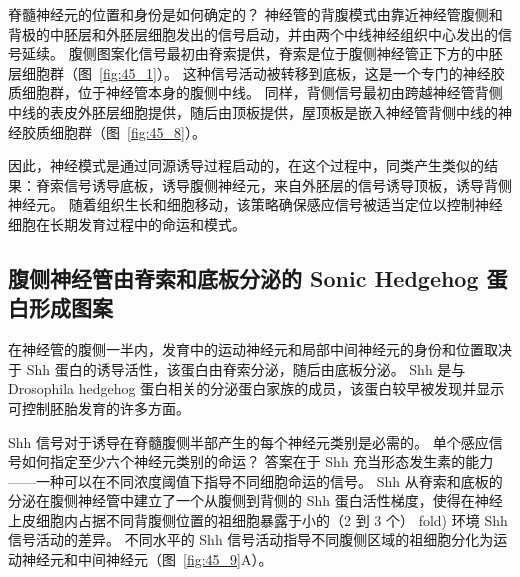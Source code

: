 脊髓神经元的位置和身份是如何确定的？
神经管的背腹模式由靠近神经管腹侧和背极的中胚层和外胚层细胞发出的信号启动，并由两个中线神经组织中心发出的信号延续。
腹侧图案化信号最初由脊索提供，脊索是位于腹侧神经管正下方的中胚层细胞群（图~\ref{fig:45_1}）。
这种信号活动被转移到底板，这是一个专门的神经胶质细胞群，位于神经管本身的腹侧中线。
同样，背侧信号最初由跨越神经管背侧中线的表皮外胚层细胞提供，随后由顶板提供，屋顶板是嵌入神经管背侧中线的神经胶质细胞群（图~\ref{fig:45_8}）。


因此，神经模式是通过同源诱导过程启动的，在这个过程中，同类产生类似的结果：脊索信号诱导底板，诱导腹侧神经元，来自外胚层的信号诱导顶板，诱导背侧神经元。
随着组织生长和细胞移动，该策略确保感应信号被适当定位以控制神经细胞在长期发育过程中的命运和模式。



\subsection{腹侧神经管由脊索和底板分泌的 Sonic Hedgehog 蛋白形成图案}

在神经管的腹侧一半内，发育中的运动神经元和局部中间神经元的身份和位置取决于 Shh 蛋白的诱导活性，该蛋白由脊索分泌，随后由底板分泌。
Shh 是与 Drosophila hedgehog 蛋白相关的分泌蛋白家族的成员，该蛋白较早被发现并显示可控制胚胎发育的许多方面。


Shh 信号对于诱导在脊髓腹侧半部产生的每个神经元类别是必需的。
单个感应信号如何指定至少六个神经元类别的命运？
答案在于 Shh 充当形态发生素的能力——一种可以在不同浓度阈值下指导不同细胞命运的信号。
Shh 从脊索和底板的分泌在腹侧神经管中建立了一个从腹侧到背侧的 Shh 蛋白活性梯度，使得在神经上皮细胞内占据不同背腹侧位置的祖细胞暴露于小的（2 到 3 个） fold) 环境 Shh 信号活动的差异。
不同水平的 Shh 信号活动指导不同腹侧区域的祖细胞分化为运动神经元和中间神经元（图~\ref{fig:45_9}A）。


